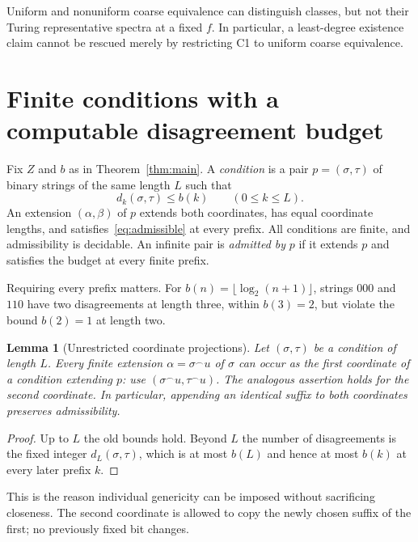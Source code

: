 \documentclass[11pt,a4paper]{article}
\newcommand{\cat}{\mathbin{{}^{\frown}}}
\newtheorem{lemma}[theorem]{Lemma}
\theoremstyle{definition}\newtheorem{definition}[theorem]{Definition}
\theoremstyle{remark}\newtheorem{remark}[theorem]{Remark}
\begin{document}
Uniform and nonuniform coarse equivalence can distinguish classes, but not their Turing representative spectra at a fixed $f$. In particular, a least-degree existence claim cannot be rescued merely by restricting C1 to uniform coarse equivalence.

\section{Finite conditions with a computable disagreement budget}
\label{sec:conditions}

Fix $Z$ and $b$ as in Theorem~\ref{thm:main}. A \emph{condition} is a pair $p=(\sigma,\tau)$ of binary strings of the same length $L$ such that
\begin{equation}\label{eq:admissible}
       d_k(\sigma,\tau)\le b(k)\qquad(0\le k\le L).
\end{equation}
An extension $(\alpha,\beta)$ of $p$ extends both coordinates, has equal coordinate lengths, and satisfies~\eqref{eq:admissible} at every prefix. All conditions are finite, and admissibility is decidable. An infinite pair is \emph{admitted by} $p$ if it extends $p$ and satisfies the budget at every finite prefix.

Requiring every prefix matters. For $b(n)=\lfloor\log_2(n+1)\rfloor$, strings $000$ and $110$ have two disagreements at length three, within $b(3)=2$, but violate the bound $b(2)=1$ at length two.

\begin{lemma}[Unrestricted coordinate projections]
\label{lem:projection}
Let $(\sigma,\tau)$ be a condition of length $L$. Every finite extension $\alpha=\sigma\cat u$ of $\sigma$ can occur as the first coordinate of a condition extending $p$: use $(\sigma\cat u,\tau\cat u)$. The analogous assertion holds for the second coordinate. In particular, appending an identical suffix to both coordinates preserves admissibility.
\end{lemma}
\begin{proof}
Up to $L$ the old bounds hold. Beyond $L$ the number of disagreements is the fixed integer $d_L(\sigma,\tau)$, which is at most $b(L)$ and hence at most $b(k)$ at every later prefix $k$.
\end{proof}

This is the reason individual genericity can be imposed without sacrificing closeness. The second coordinate is allowed to copy the newly chosen suffix of the first; no previously fixed bit changes.
\end{document}
